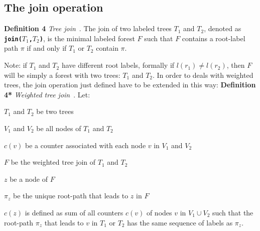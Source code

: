 \documentclass[a4paper,10pt]{report}
\begin{document}
\subsection{The join operation}

\textbf{Definition 4} \emph{Tree join}~\cite{kccf}. 
The join of two labeled trees $T_1$ and $T_2$, denoted as 
\texttt{\textbf{join(}}$T_1$\texttt{\textbf{,}}$T_2$\texttt{\textbf{)}}, 
is the minimal labeled forest $F$ such that $F$ contains a root-label path $\pi$ if and 
only if $T_1$ or $T_2$ contain $\pi$.

Note: if $T_1$ and $T_2$ have different root labels, 
formally if $l(r_1)\ne l(r_2)$, then $F$ will be simply a forest with two trees: $T_1$ and $T_2$. In order to deals with weighted trees, the join operation just defined have to be extended in this way: 
\newpage
\textbf{Definition 4*} \emph{Weighted tree join}~\cite{kccf}.
Let: 

\renewcommand{\labelitemi}{$-$}

\begin{itemize*}
\item $T_1$ and $T_2$ be two trees
\item $V_1$ and $V_2$ be all nodes of $T_1$ and $T_2$
\item $c(v)$ be a counter associated with each node $v$ in $V_1$ and $V_2$
\item $F$ be the weighted tree join of $T_1$ and $T_2$
\item $z$ be a node of $F$
\item $\pi_z$ be the unique root-path that leads to $z$ in $F$
\end{itemize*}
\renewcommand{\labelitemi}{$\bullet$}
$c(z)$ is defined as sum of all counters $c(v)$ of nodes $v$ in $V_1 \cup V_2$ such
that the root-path $\pi_z$ that leads to $v$ in $T_1$ or $T_2$ has the same sequence of 
labels as $\pi_z$.
\end{document}
